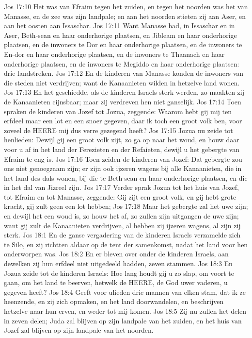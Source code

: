 Jos 17:10  Het was van Efraim tegen het zuiden, en tegen het noorden was het van Manasse, en de zee was zijn landpale; en aan het noorden stieten zij aan Aser, en aan het oosten aan Issaschar.
Jos 17:11  Want Manasse had, in Issaschar en in Aser, Beth-sean en haar onderhorige plaatsen, en Jibleam en haar onderhorige plaatsen, en de inwoners te Dor en haar onderhorige plaatsen, en de inwoners te En-dor en haar onderhorige plaatsen, en de inwoners te Thaanach en haar onderhorige plaatsen, en de inwoners te Megiddo en haar onderhorige plaatsen: drie landstreken.
Jos 17:12  En de kinderen van Manasse konden de inwoners van die steden niet verdrijven; want de Kanaanieten wilden in hetzelve land wonen.
Jos 17:13  En het geschiedde, als de kinderen Israels sterk werden, zo maakten zij de Kanaanieten cijnsbaar; maar zij verdreven hen niet ganselijk.
Jos 17:14  Toen spraken de kinderen van Jozef tot Jozua, zeggende: Waarom hebt gij mij ten erfdeel maar een lot en een snoer gegeven, daar ik toch een groot volk ben, voor zoveel de HEERE mij dus verre gezegend heeft?
Jos 17:15  Jozua nu zeide tot henlieden: Dewijl gij een groot volk zijt, zo ga op naar het woud, en houw daar voor u af in het land der Ferezieten en der Refaieten, dewijl u het gebergte van Efraim te eng is.
Jos 17:16  Toen zeiden de kinderen van Jozef: Dat gebergte zou ons niet genoegzaam zijn; er zijn ook ijzeren wagens bij alle Kanaanieten, die in het land des dals wonen, bij die te Beth-sean en haar onderhorige plaatsen, en die in het dal van Jizreel zijn.
Jos 17:17  Verder sprak Jozua tot het huis van Jozef, tot Efraim en tot Manasse, zeggende: Gij zijt een groot volk, en gij hebt grote kracht, gij zult geen een lot hebben;
Jos 17:18  Maar het gebergte zal het uwe zijn; en dewijl het een woud is, zo houw het af, zo zullen zijn uitgangen de uwe zijn; want gij zult de Kanaanieten verdrijven, al hebben zij ijzeren wagens, al zijn zij sterk.
Jos 18:1  En de ganse vergadering van de kinderen Israels verzamelde zich te Silo, en zij richtten aldaar op de tent der samenkomst, nadat het land voor hen onderworpen was.
Jos 18:2  En er bleven over onder de kinderen Israels, aan dewelken zij hun erfdeel niet uitgedeeld hadden, zeven stammen.
Jos 18:3  En Jozua zeide tot de kinderen Israels: Hoe lang houdt gij u zo slap, om voort te gaan, om het land te beerven, hetwelk de HEERE, de God uwer vaderen, u gegeven heeft?
Jos 18:4  Geeft voor ulieden drie mannen van elken stam, dat ik ze heenzende, en zij zich opmaken, en het land doorwandelen, en beschrijven hetzelve naar hun erven, en weder tot mij komen.
Jos 18:5  Zij nu zullen het delen in zeven delen; Juda zal blijven op zijn landpale van het zuiden, en het huis van Jozef zal blijven op zijn landpale van het noorden.
